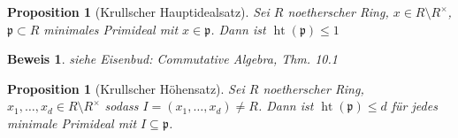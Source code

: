 \documentclass[a4paper, 12pt, numbers=noendperiod, chapterprefix=true, headsepline]{scrbook}
\theoremstyle{break}
\newtheorem{Prop}[Def]{Proposition}
\theoremstyle{nonumberbreak}
\newtheorem{Bew}{Beweis}
\theoremstyle{nonumberplain}
\DeclareMathOperator{\Ht}{ht}
\newcommand{\frakp}{\mathfrak{p}}
\begin{document}
\begin{Prop}[Krullscher Hauptidealsatz]\label{prop18.11}
Sei $R$ noetherscher Ring, $x\in R\setminus R^{\times}$, $\mathfrak p\subset R$ minimales Primideal mit $x\in \mathfrak p$. Dann ist $\Ht(\frakp)\le1$
\end{Prop}

\begin{Bew}
siehe Eisenbud: Commutative Algebra, Thm. 10.1
\end{Bew}

\begin{Prop}[Krullscher H\"ohensatz]
Sei $R$ noetherscher Ring, $x_1,\ldots ,x_d\in R\setminus R^{\times}$ sodass $I=(x_1,\ldots ,x_d)\ne R$. Dann ist $\Ht(\frakp)\le d$ f\"ur jedes minimale Primideal mit $I\subseteq \frakp$.
\end{Prop}
\end{document}
